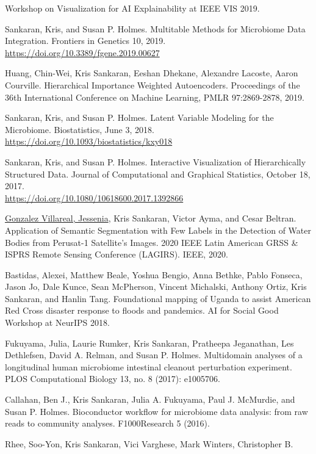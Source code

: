 \documentclass[letterpaper]{article}
\renewenvironment{itemize}{
  \begin{list}{}{
    \setlength{\leftmargin}{1.5em}
  }
}{
  \end{list}
}
\begin{document}
\begin{itemize}
  Workshop on Visualization for AI Explainability at IEEE VIS 2019.
\item Sankaran, Kris, and Susan P. Holmes. Multitable Methods for Microbiome
Data Integration. Frontiers in Genetics 10, 2019.
\href{https://doi.org/10.3389/fgene.2019.00627}{https://doi.org/10.3389/fgene.2019.00627}
\item Huang, Chin-Wei, Kris Sankaran, Eeshan Dhekane, Alexandre Lacoste, Aaron
  Courville. Hierarchical Importance Weighted Autoencoders. Proceedings of the
  36th International Conference on Machine Learning, PMLR 97:2869-2878, 2019.
 \item Sankaran, Kris, and Susan P. Holmes. Latent Variable Modeling for the
   Microbiome. Biostatistics, June 3, 2018.
   \href{https://doi.org/10.1093/biostatistics/kxy018}{https://doi.org/10.1093/biostatistics/kxy018}
 \item Sankaran, Kris, and Susan P. Holmes. Interactive Visualization of
   Hierarchically Structured Data. Journal of Computational and Graphical
   Statistics, October 18, 2017. \\
   \href{https://doi.org/10.1080/10618600.2017.1392866}{https://doi.org/10.1080/10618600.2017.1392866}
  \item \underline{Gonzalez Villareal, Jessenia}, Kris Sankaran, Victor Ayma,
  and Cesar Beltran. Application of Semantic Segmentation with Few Labels in the
  Detection of Water Bodies from Perusat-1 Satellite’s Images. 2020 IEEE Latin
  American GRSS \& ISPRS Remote Sensing Conference (LAGIRS). IEEE, 2020.
  \item Bastidas, Alexei, Matthew Beale, Yoshua Bengio, Anna Bethke, Pablo
    Fonseca, Jason Jo, Dale Kunce, Sean McPherson, Vincent Michalski, Anthony
    Ortiz, Kris Sankaran, and Hanlin Tang. Foundational mapping of Uganda to
    assist American Red Cross disaster response to floods and pandemics. AI for
    Social Good Workshop at NeurIPS 2018.
  \item Fukuyama, Julia, Laurie Rumker, Kris Sankaran, Pratheepa Jeganathan, Les
    Dethlefsen, David A. Relman, and Susan P. Holmes. Multidomain analyses of a
    longitudinal human microbiome intestinal cleanout perturbation experiment.
    PLOS Computational Biology 13, no. 8 (2017): e1005706.
  \item Callahan, Ben J., Kris Sankaran, Julia A. Fukuyama, Paul J. McMurdie, and
    Susan P. Holmes. Bioconductor workflow for microbiome data analysis: from
    raw reads to community analyses. F1000Research 5 (2016).
  \item Rhee, Soo-Yon, Kris Sankaran, Vici Varghese, Mark Winters, Christopher B.

\end{itemize}
\end{document}
